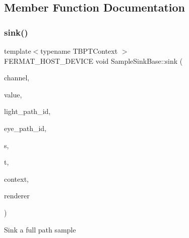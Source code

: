 \subsection{Member Function Documentation}
\mbox{\label{struct_sample_sink_base_ab34316c125cab0da36ea2ae41e67f98f}} 
\subsubsection{\texorpdfstring{sink()}{sink()}}
{\footnotesize\ttfamily template$<$typename T\+B\+P\+T\+Context $>$ \\
F\+E\+R\+M\+A\+T\+\_\+\+H\+O\+S\+T\+\_\+\+D\+E\+V\+I\+CE void Sample\+Sink\+Base\+::sink (\begin{DoxyParamCaption}\item[{const uint32}]{channel,  }\item[{const \hyperlink{structcugar_1_1_vector}{cugar\+::\+Vector4f}}]{value,  }\item[{const uint32}]{light\+\_\+path\+\_\+id,  }\item[{const uint32}]{eye\+\_\+path\+\_\+id,  }\item[{const uint32}]{s,  }\item[{const uint32}]{t,  }\item[{T\+B\+P\+T\+Context \&}]{context,  }\item[{\hyperlink{struct_rendering_context_view}{Rendering\+Context\+View} \&}]{renderer }\end{DoxyParamCaption})\hspace{0.3cm}{\ttfamily [inline]}}

Sink a full path sample \mbox{\label{struct_sample_sink_base_ac96fd485e8196264c43115c68a0bbc25}} 
